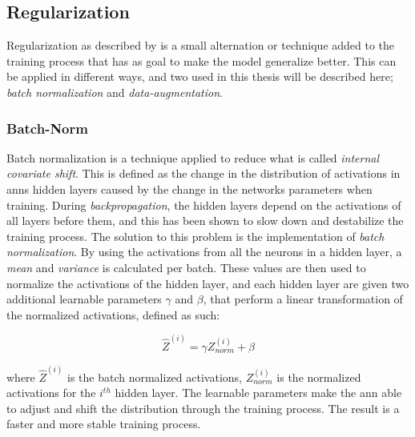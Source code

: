     

    
\subsection{Regularization}
    Regularization as described by \citeauthor{kukavcka2017_regularization}\cite{kukavcka2017_regularization} is a small alternation or technique added to the training process that has as goal to make the model generalize better. This can be applied in different ways, and two used in this thesis will be described here; \textit{batch normalization} and \textit{data-augmentation}.
    
\subsubsection{Batch-Norm}
    Batch normalization is a technique applied to reduce what is called \textit{internal  covariate shift}\cite{pmlr-v37-ioffe15_batch_norm}. This is defined as the change in the distribution of activations in \gls{ann}s hidden layers caused by the change in the networks parameters when training. During \textit{backpropagation}, the hidden layers depend on the activations of all layers before them, and this has been shown to slow down and destabilize the training process. The solution to this problem is the implementation of \textit{batch normalization}. By using the activations from all the neurons in a hidden layer, a \textit{mean} and \textit{variance} is calculated per batch. These values are then used to normalize the activations of the hidden layer, and each hidden layer are given two additional learnable parameters $\gamma$ and $\beta$, that perform a linear transformation of the normalized activations, defined as such:
    
        \begin{equation} \label{batch_normalization}
            \hat{Z}^{(i)} =   \gamma Z^{(i)}_{norm} + \beta
        \end{equation}
    
    where $\hat{Z}^{(i)}$ is the batch normalized activations, $Z^{(i)}_{norm}$ is the normalized activations for the $i^{th}$ hidden layer. The learnable parameters make the \gls{ann} able to adjust and shift the distribution through the training process. The result is a faster and more stable training process. 

